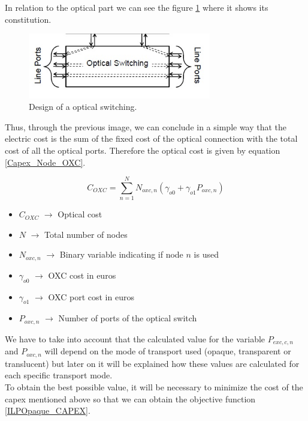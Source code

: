 \vspace{11pt}
In relation to the optical part we can see the figure \ref{oxc_design} where it shows its constitution.

\begin{figure}[h!]
\centering
\includegraphics[width=8cm]{sdf/ILP/figures/oxc_design}
\caption{Design of a optical switching.}
\label{oxc_design}
\end{figure}


Thus, through the previous image, we can conclude in a simple way that the electric cost is the sum of the fixed cost of the optical connection with the total cost of all the optical ports.
Therefore the optical cost is given by equation \ref{Capex_Node_OXC}.

\begin{equation}
C_{OXC} = \sum_{n=1}^{N} N_{oxc,n} \left( \gamma_{o0} + \gamma_{o1} P_{oxc,n} \right)
\label{Capex_Node_OXC}
\end{equation}

\begin{itemize}
\item{$C_{OXC}$			$\rightarrow$	Optical cost}
\item{$N$				$\rightarrow$	Total number of nodes}
\item{$N_{oxc,n}$		$\rightarrow$	Binary variable indicating if node $n$ is used}
\item{$\gamma_{o0}$ 	$\rightarrow$	OXC cost in euros}
\item{$\gamma_{o1}$ 	$\rightarrow$	OXC port cost in euros }
\item{$P_{oxc,n}$	    $\rightarrow$	Number of ports of the optical switch}
\end{itemize}


\vspace{10pt}
We have to take into account that the calculated value for the variable $P_{exc,c,n}$ and $P_{oxc,n}$ will depend on the mode of transport used (opaque, transparent or translucent) but later on it will be explained how these values are calculated for each specific transport mode.\\
To obtain the best possible value, it will be necessary to minimize the cost of the capex mentioned above so that we can obtain the objective function \ref{ILPOpaque_CAPEX}.

